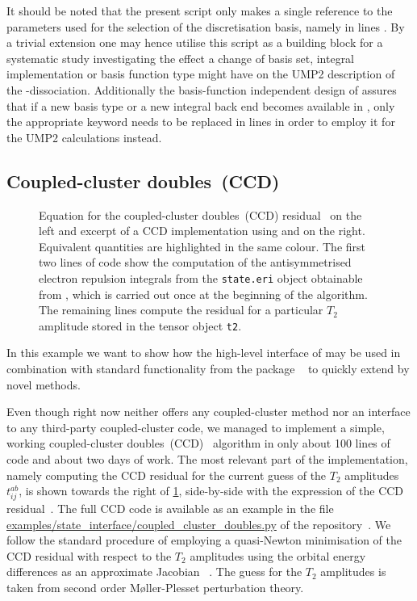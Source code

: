 It should be noted
that the present script only makes a single reference to the
parameters used for the selection of the discretisation basis,
namely in lines \ldict.
By a trivial extension one may hence utilise
this script as a building block for a systematic study
investigating the effect
a change of basis set, integral implementation or basis function type
might have on the UMP2 description of the -dissociation.
Additionally the basis-function independent design of \molsturm
assures that if a new basis type or a new integral back end
becomes available in \gint,
only the appropriate keyword needs to be replaced in lines \ldict
in order to employ it for the UMP2 calculations instead.

\subsection{Coupled-cluster doubles~(CCD)}
\label{sec:ex:ccd}

\begin{figure}
	
	\caption{Equation for the coupled-cluster doubles~(CCD)
		residual~\cite{Bartlett1978}
		on the left and excerpt of a CCD implementation
		using \molsturm and \numpy on the right.
		Equivalent quantities are highlighted in the same colour.
		The first two lines of code show the computation of the
		antisymmetrised electron repulsion integrals
		from the \texttt{state.eri} object obtainable from \molsturm,
		which is carried out once at the beginning of the algorithm.
		The remaining lines compute the residual for
		a particular $T_2$ amplitude stored in the tensor object
		\texttt{t2}.
	}
	\label{fig:codeCCD}
\end{figure}

In this example we want to show how the
high-level \python interface of \molsturm may be used
in combination with standard functionality from the \python
package \numpy~\cite{Walt2011,scipyWeb} to quickly extend
\molsturm by novel methods.

Even though \molsturm right now neither offers
any coupled-cluster method nor
an interface to any third-party coupled-cluster code,
we managed to implement a simple, working
coupled-cluster doubles~(CCD)~\cite{Hurley1976,Bartlett1978} algorithm
in only about 100 lines of code and about two days of work.
The most relevant part of the implementation,
namely computing the CCD residual for the current guess
of the $T_2$ amplitudes $t_{ij}^{ab}$,
is shown towards the right of \fig \ref{fig:codeCCD},
side-by-side with the expression of the CCD residual~\cite{Bartlett1978}.
The full CCD code is available as an example
in the file \url{examples/state_interface/coupled_cluster_doubles.py}
of the \molsturm repository~\cite{molsturmWeb}.
We follow the standard procedure
of employing a quasi-Newton minimisation
of the CCD residual with respect to the $T_2$ amplitudes
using the orbital energy differences as an approximate Jacobian%
~\cite{Bartlett1978,Helgaker2013}.
The guess for the $T_2$ amplitudes is taken
from second order Møller-Plesset perturbation theory.

